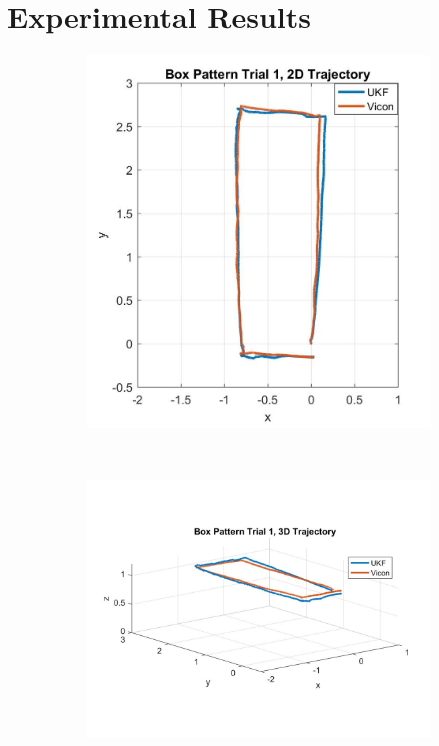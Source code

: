 \chapter{Experimental Results}


\begin{figure}
    \centering
    \begin{subfigure}{0.4\textwidth}
        \includegraphics[width=\textwidth,left]{box1_2d}
    \end{subfigure}%
    ~ 
    \begin{subfigure}{0.6\textwidth}
        \centering
        \includegraphics[width=\textwidth,right]{box1_3d}

\end{subfigure}
\end{figure}

